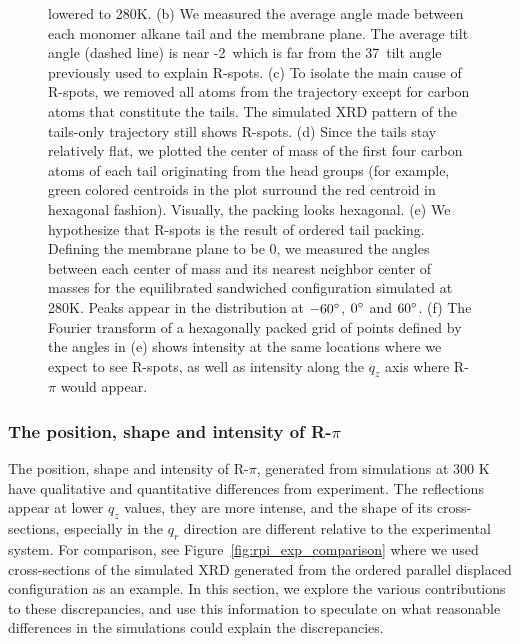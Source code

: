 \documentclass[journal=jpcbfk,manuscript=article]{achemso}
\begin{document}
\begin{figure}[!htb]
{      lowered to 280K. (b) We measured the average angle made between each monomer 
      alkane tail and the membrane plane. The average tilt angle (dashed line) is 
      near -2\degree~which is far from the 37\degree~tilt angle previously used to
      explain R-spots. (c) To isolate the main cause of R-spots, we removed all atoms
      from the trajectory except for carbon atoms that constitute the tails. The
      simulated XRD pattern of the tails-only trajectory still shows R-spots. (d)
      Since the tails stay relatively flat, we plotted the center of mass of the first
      four carbon atoms of each tail originating from the head groups (for example,
      green colored centroids in the plot surround the red centroid in hexagonal fashion).
      Visually, the packing looks hexagonal. (e) We hypothesize
      that R-spots is the result of ordered tail packing. Defining
      the membrane plane to be 0\degree, we measured the angles between each center of 
      mass and its nearest neighbor center of masses for the equilibrated 
      sandwiched configuration simulated at 280K. Peaks appear in the distribution at 
      $-60\degree$, $0\degree$ and $60\degree$. (f) The Fourier transform of a hexagonally
      packed grid of points defined by the angles in (e) shows intensity at the same
      locations where we expect to see R-spots, as well as intensity along the $q_z$ axis
      where R-$\pi$ would appear.}~\label{fig:tail_packing}
  \end{figure}  

  \subsubsection{The position, shape and intensity of R-$\pi$}\label{section:rpi}

  The position, shape and intensity of R-$\pi$, generated from simulations at
  300 K have qualitative and quantitative differences from experiment.
  The reflections appear at lower $q_z$ values, they
  are more intense, and the shape of its cross-sections, especially in the $q_r$
  direction are different relative to the experimental system.  For comparison,
  see Figure~\ref{fig:rpi_exp_comparison} where we used cross-sections of the
  simulated XRD generated from the ordered parallel displaced configuration as an
  example. In this section, we explore the various contributions to these
  discrepancies, and use this information to speculate on what reasonable
  differences in the simulations could explain the discrepancies.
  
\end{document}
